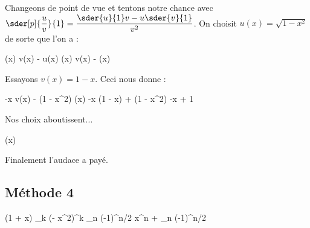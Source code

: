 \documentclass[12pt]{article}
\begin{document}
Changeons de point de vue et tentons notre chance avec
$\sder[p]{\dfrac{u}{v}}{1} = \dfrac{\sder{u}{1} v - u \sder{v}{1}}{v^2}$.
On choisit $u(x) = \sqrt{1 - x^2}$ de sorte que l'on a :


\bigskip


\begin{explain}[style = ar]
	(x) v(x) - u(x) (x)
		\explnext{}
	 v(x) -  (x)
		\explnext{}
\end{explain}


\bigskip


Essayons $v(x) = 1 - x$. Ceci nous donne :


\bigskip


\begin{explain}[style = ar]
	-x v(x) - (1 - x^2) (x)
		\explnext{}
	-x (1 - x) + (1 - x^2)
		\explnext{}
	-x + 1
\end{explain}


\bigskip


Nos choix aboutissent...


\bigskip


\begin{explain}[style = ar]
	(x)
		\explnext{}
		\explnext{}
\end{explain}


\bigskip


Finalement l'audace a payé.


\bigskip


\begin{explain}[style = ar]
	\displaystyle
	\int {} 
		\explnext{}
\end{explain}




\subsection{Méthode 4}

\begin{explain}[style = ar]
	\displaystyle
	\int {} 
		\explnext{}
	\displaystyle
	\int {} 
	\displaystyle
	\int (1 + x) \cdot \sum_{k } (- x^2)^k  
	\displaystyle
	\int \sum_{n }  \cdot (-1)^{n/2} x^n 
	 + \sum_{n }  \cdot (-1)^{n/2} 
\end{explain}
\end{document}
